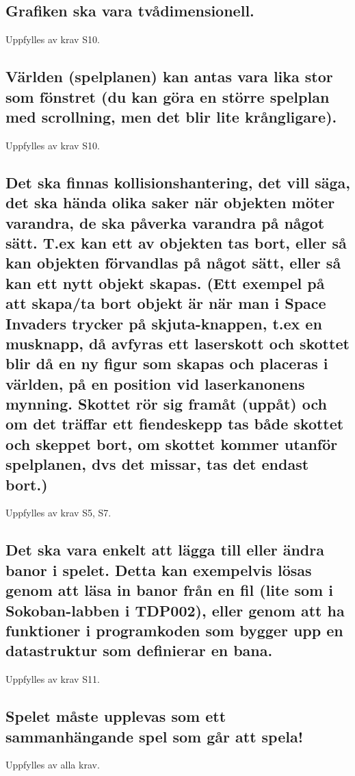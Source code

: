 \documentclass{TDP005mall}
\begin{document}
\subsection{Grafiken ska vara tvådimensionell.}
Uppfylles av krav S10.
\subsection{Världen (spelplanen) kan antas vara lika stor som fönstret (du kan göra en större spelplan med scrollning, men det blir lite krångligare).}
Uppfylles av krav S10.
\subsection{Det ska finnas kollisionshantering, det vill säga, det ska hända olika saker när objekten möter varandra, de ska påverka varandra på något sätt. T.ex kan ett av objekten tas bort, eller så kan objekten förvandlas på något sätt, eller så kan ett nytt objekt skapas. (Ett exempel på att skapa/ta bort objekt är när man i Space Invaders trycker på skjuta-knappen, t.ex en musknapp, då avfyras ett laserskott och skottet blir då en ny figur som skapas och placeras i världen, på en position vid laserkanonens mynning. Skottet rör sig framåt (uppåt) och om det träffar ett fiendeskepp tas både skottet och skeppet bort, om skottet kommer utanför spelplanen, dvs det missar, tas det endast bort.)}
Uppfylles av krav S5, S7.
\subsection{Det ska vara enkelt att lägga till eller ändra banor i spelet. Detta kan exempelvis lösas genom att läsa in banor från en fil (lite som i Sokoban-labben i TDP002), eller genom att ha funktioner i programkoden som bygger upp en datastruktur som definierar en bana.}
Uppfylles av krav S11.
\subsection{Spelet måste upplevas som ett sammanhängande spel som går att spela!}
Uppfylles av alla krav.
\end{document}
